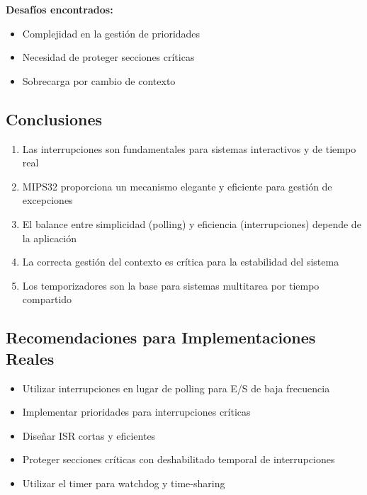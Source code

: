 \documentclass[12pt,a4paper]{article}
\begin{document}
\textbf{Desafíos encontrados:}
\begin{itemize}
    \item Complejidad en la gestión de prioridades
    \item Necesidad de proteger secciones críticas
    \item Sobrecarga por cambio de contexto
\end{itemize}

\subsection{Conclusiones}

\begin{enumerate}
    \item Las interrupciones son fundamentales para sistemas interactivos y de tiempo real
    \item MIPS32 proporciona un mecanismo elegante y eficiente para gestión de excepciones
    \item El balance entre simplicidad (polling) y eficiencia (interrupciones) depende de la aplicación
    \item La correcta gestión del contexto es crítica para la estabilidad del sistema
    \item Los temporizadores son la base para sistemas multitarea por tiempo compartido
\end{enumerate}

\subsection{Recomendaciones para Implementaciones Reales}
\begin{itemize}
    \item Utilizar interrupciones en lugar de polling para E/S de baja frecuencia
    \item Implementar prioridades para interrupciones críticas
    \item Diseñar ISR cortas y eficientes
    \item Proteger secciones críticas con deshabilitado temporal de interrupciones
    \item Utilizar el timer para watchdog y time-sharing
\end{itemize}
\end{document}
